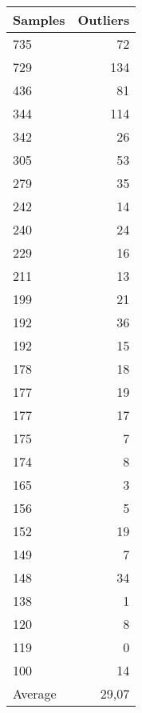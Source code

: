     \begin{singlespace}
        \begin{Figure}
            \begin{center}
                \begin{tabular}{ l | r }
                    Samples & Outliers \\ \hline
                    735 & 72\\
                    729 & 134\\
                    436 & 81\\
                    344 & 114\\
                    342 & 26\\
                    305 & 53\\
                    279 & 35\\
                    242 & 14\\
                    240 & 24\\
                    229 & 16\\
                    211 & 13\\
                    199 & 21\\
                    192 & 36\\
                    192 & 15\\
                    178 & 18\\
                    177 & 19\\
                    177 & 17\\
                    175 & 7\\
                    174 & 8\\
                    165 & 3\\
                    156 & 5\\
                    152 & 19\\
                    149 & 7\\
                    148 & 34\\
                    138 & 1\\
                    120 & 8\\
                    119 & 0\\
                    100 & 14\\ \hline\hline
                    Average & ~29,07
                \end{tabular}
            \end{center}
            \label{tbl:size-outliers}
        \end{Figure}
    \end{singlespace}
    
